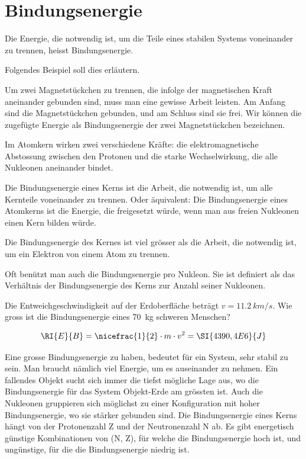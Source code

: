 \documentclass[12pt,a4paper,twoside]{article}
\begin{document}


\section*{Bindungsenergie}

Die Energie, die notwendig ist, um die Teile eines stabilen Systems voneinander zu trennen, heisst Bindungsenergie.

Folgendes Beispiel soll dies erläutern.

Um zwei Magnetstückchen zu trennen, die infolge der magnetischen Kraft aneinander gebunden sind, 
muss man eine gewisse Arbeit leisten. Am Anfang sind die Magnetstückchen gebunden, und am Schluss
sind sie frei. Wir können die zugefügte Energie als Bindungsenergie der zwei Magnetstückchen bezeichnen.

Im Atomkern wirken zwei verschiedene Kräfte: die elektromagnetische Abstossung zwischen den Protonen
und die starke Wechselwirkung, die alle Nukleonen aneinander bindet.


Die Bindungsenergie eines Kerns ist die Arbeit, die notwendig ist, um alle Kernteile voneinander zu trennen.
Oder äquivalent: Die Bindungsenergie eines Atomkerns ist die Energie, die freigesetzt würde,
wenn man aus freien Nukleonen einen Kern bilden würde.


Die Bindungsenergie des Kernes ist viel grösser als die Arbeit, die notwendig ist, um ein Elektron von einem Atom zu trennen.

Oft benützt man auch die Bindungsenergie pro Nukleon. Sie ist definiert als das Verhältnis der Bindungsenergie des Kerns zur Anzahl seiner Nukleonen.

\begin{aufgabe}
	Die Entweichgeschwindigkeit auf der Erdoberfläche beträgt $v = \SI{11.2}{km/s}$.
	Wie gross ist die Bindungsenergie eines \SI{70}{kg} schweren Menschen?


	\begin{loesung}
		\begin{eqnarray*}
			\RI{E}{B}=\nicefrac{1}{2}\cdot m\cdot v^2=\SI{4390,4E6}{J}
		\end{eqnarray*}
	\end{loesung}
\end{aufgabe}


Eine grosse Bindungsenergie zu haben, bedeutet für ein System, sehr stabil zu sein. 
Man braucht nämlich viel Energie, um es auseinander zu nehmen. Ein fallendes Objekt 
sucht sich immer die tiefst mögliche Lage aus, wo die Bindungsenergie für das System
Objekt\nobreakdash-Erde am grössten ist. Auch die Nukleonen gruppieren sich möglichst
zu einer Konfiguration mit hoher Bindungsenergie, wo sie stärker gebunden sind.
Die Bindungsenergie eines Kerns hängt von der Protonenzahl Z und der Neutronenzahl N ab.
Es gibt energetisch günstige Kombinationen von (N, Z), für welche die Bindungsenergie hoch
ist, und ungünstige, für die die Bindungsenergie niedrig ist. 
\end{document}
